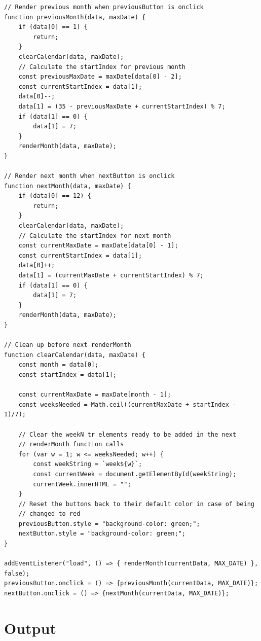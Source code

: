 \documentclass[12pt]{report} %
\begin{document}
\begin{verbatim}
// Render previous month when previousButton is onclick
function previousMonth(data, maxDate) {
    if (data[0] == 1) {
        return;
    }
    clearCalendar(data, maxDate);
    // Calculate the startIndex for previous month
    const previousMaxDate = maxDate[data[0] - 2];
    const currentStartIndex = data[1];
    data[0]--;
    data[1] = (35 - previousMaxDate + currentStartIndex) % 7;
    if (data[1] == 0) {
        data[1] = 7;
    }
    renderMonth(data, maxDate);
}

// Render next month when nextButton is onclick
function nextMonth(data, maxDate) {
    if (data[0] == 12) {
        return;
    }
    clearCalendar(data, maxDate);
    // Calculate the startIndex for next month
    const currentMaxDate = maxDate[data[0] - 1];
    const currentStartIndex = data[1];
    data[0]++;
    data[1] = (currentMaxDate + currentStartIndex) % 7;
    if (data[1] == 0) {
        data[1] = 7;
    }
    renderMonth(data, maxDate);
}

// Clean up before next renderMonth
function clearCalendar(data, maxDate) {
    const month = data[0];
    const startIndex = data[1];

    const currentMaxDate = maxDate[month - 1];
    const weeksNeeded = Math.ceil((currentMaxDate + startIndex - 1)/7);

    // Clear the weekN tr elements ready to be added in the next
    // renderMonth function calls
    for (var w = 1; w <= weeksNeeded; w++) {
        const weekString = `week${w}`;
        const currentWeek = document.getElementById(weekString);
        currentWeek.innerHTML = "";
    }
    // Reset the buttons back to their default color in case of being
    // changed to red
    previousButton.style = "background-color: green;";
    nextButton.style = "background-color: green;";
}

addEventListener("load", () => { renderMonth(currentData, MAX_DATE) }, false);
previousButton.onclick = () => {previousMonth(currentData, MAX_DATE)};
nextButton.onclick = () => {nextMonth(currentData, MAX_DATE)};
\end{verbatim}

\newpage

\section*{Output}
\end{document}
